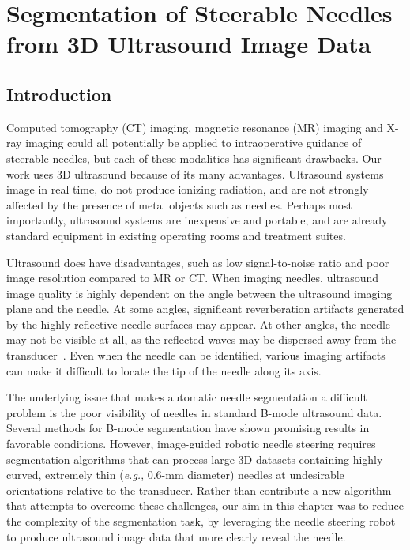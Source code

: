 \chapter[Segmentation from 3D Ultrasound]{Segmentation of Steerable Needles from 3D Ultrasound Image Data}

\section{Introduction}
Computed tomography (CT) imaging, magnetic resonance (MR) imaging and X-ray imaging could all potentially be applied to intraoperative guidance of steerable needles, but each of these modalities has significant drawbacks. Our work uses 3D ultrasound because of its many advantages. Ultrasound systems image in real time, do not produce ionizing radiation, and are not strongly affected by the presence of metal objects such as needles. Perhaps most importantly, ultrasound systems are inexpensive and portable, and are already standard equipment in existing operating rooms and treatment suites.  

Ultrasound does have disadvantages, such as low signal-to-noise ratio and poor image resolution compared to MR or CT. When imaging needles, ultrasound image quality is highly dependent on the angle between the ultrasound imaging plane and the needle. At some angles, significant reverberation artifacts generated by the highly reflective needle surfaces may appear. At other angles, the needle may not be visible at all, as the reflected waves may be dispersed away from the transducer~\cite{Chung2004}. Even when the needle can be identified, various imaging artifacts can make it difficult to locate the tip of the needle along its axis. 

The underlying issue that makes automatic needle segmentation a difficult problem is the poor visibility of needles in standard B-mode ultrasound data. Several methods for B-mode segmentation have shown promising results in favorable conditions. However, image-guided robotic needle steering requires segmentation algorithms that can process large 3D datasets containing highly curved, extremely thin (\textit{e.g.}, 0.6-mm diameter) needles at undesirable orientations relative to the transducer. Rather than contribute a new algorithm that attempts to overcome these challenges, our aim in this chapter was to reduce the complexity of the segmentation task, by leveraging the needle steering robot to produce ultrasound image data that more clearly reveal the needle.

